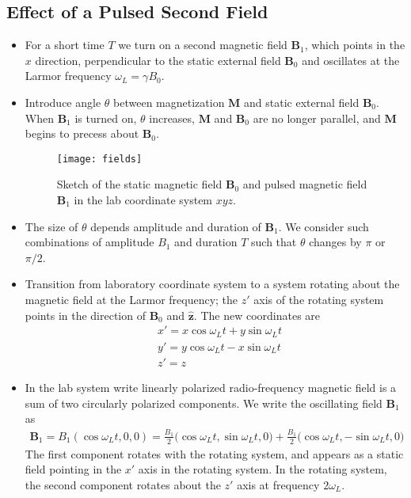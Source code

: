 \documentclass[11pt, a4paper]{article}
\renewcommand{\vec}[1]{\bm{#1}}
\newcommand{\uvec}[1]{\hat{\bm{#1}}}
\newcommand{\B}{\vec{B}}  %
\newcommand{\M}{\vec{M}}  %
\begin{document}
\subsection{Effect of a Pulsed Second Field}
\begin{itemize}
	\item For a short time $ T $ we turn on a second magnetic field $ \B_{1} $, which points in the $ x $ direction, perpendicular to the static external field $ \B_{0} $ and oscillates at the Larmor frequency $ \omega_{L} = \gamma B_{0} $.
	
	\item Introduce angle $ \theta $ between magnetization $ \M $ and static external field $ \B_{0} $. When $ \B_{1} $ is turned on, $ \theta $ increases, $ \M $ and $ \B_{0} $ are no longer parallel, and $ \M $ begins to precess about $ \B_{0} $.
	
	\begin{figure}
	\centering
	\texttt{[image: fields]}
	\caption{Sketch of the static magnetic field $ \B_{0} $ and pulsed magnetic field $ \B_{1} $ in the lab coordinate system $ xyz $.}
	\label{nmr:fig:schematic-fields}
	\end{figure}
	
	
	\item The size of $ \theta $ depends amplitude and duration of $ \B_{1} $. We consider such combinations of amplitude $ B_{1} $ and duration $ T $ such that $ \theta $ changes by $ \pi $ or $ \pi/2 $.
	
	\item Transition from laboratory coordinate system to a system rotating about the magnetic field at the Larmor frequency; the $ z' $ axis of the rotating system points in the direction of $ \B_{0} $ and $ \uvec{z} $. The new coordinates are
	\begin{align*}
		& x' = x\cos \omega_{L}t + y \sin \omega_{L}t\\
		& y' = y \cos \omega_{L} t - x \sin \omega_{L}t\\
		& z' = z
	\end{align*}
	
	\item In the lab system write linearly polarized radio-frequency magnetic field is a sum of two circularly polarized components. We write the oscillating field $ \B_{1} $ as
	\begin{align*}
		\B_{1} = B_{1}(\cos \omega_{L}t, 0, 0) = \frac{B_{1}}{2}\big(\cos \omega_{L}t, \sin \omega_{L}t, 0\big) + \frac{B_{1}}{2}\big(\cos \omega_{L}t, -\sin \omega_{L}t, 0\big)
	\end{align*}
	The first component rotates with the rotating system, and appears as a static field pointing in the $ x' $ axis in the rotating system. In the rotating system, the second component rotates about the $ z' $ axis at frequency $ 2 \omega_{L} $. 
	

\end{itemize}
\end{document}
